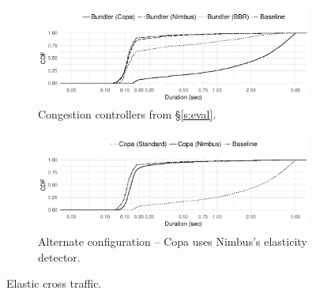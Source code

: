 \begin{figure}
    \centering
    \begin{subfigure}[b]{0.5\textwidth}
\begin{knitrout}
\color{fgcolor}
\includegraphics[width=\maxwidth]{figure/robust:cr-elastic:a-1} 

\end{knitrout}
    \caption{Congestion controllers from \S\ref{s:eval}.}\label{fig:robust:cr-elastic:a}
    \end{subfigure}
    \begin{subfigure}[b]{0.5\textwidth}
\begin{knitrout}
\color{fgcolor}
\includegraphics[width=\maxwidth]{figure/robust:cr-elastic:b-1} 

\end{knitrout}
    \caption{Alternate configuration -- Copa uses Nimbus's elasticity detector.}\label{fig:robust:cr-elastic:b}
    \end{subfigure}

    \caption{Elastic cross traffic.}
    \label{fig:robust:cr-elastic}
\end{figure}
